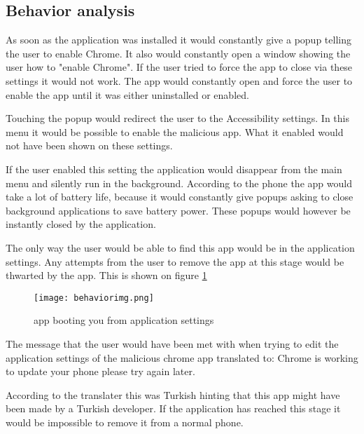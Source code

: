 \subsection{Behavior analysis}

As soon as the application was installed it would constantly give a popup telling the user to enable Chrome. 
It also would constantly open a window showing the user how to "enable Chrome". 
If the user tried to force the app to close via these settings it would not work. 
The app would constantly open and force the user to enable the app until it was either uninstalled or enabled.
 
Touching the popup would redirect the user to the Accessibility settings. 
In this menu it would be possible to enable the malicious app. 
What it enabled would not have been shown on these settings.

If the user enabled this setting the application would disappear from the main menu and silently run in the background. 
According to the phone the app would take a lot of battery life, because it would constantly give popups asking to close background applications to save battery power. 
These popups would however be instantly closed by the application.

The only way the user would be able to find this app would be in the application settings. 
Any attempts from the user to remove the app at this stage would be thwarted by the app.
This is shown on figure \ref{tim-appbehavior}

\begin{figure}[H]
    \centering
    \texttt{[image: behaviorimg.png]}
    \caption{app booting you from application settings}
    \label{tim-appbehavior}
\end{figure}

The message that the user would have been met with when trying to edit the application settings of the malicious chrome app translated to: 
Chrome is working to update your phone please try again later.

According to the translater this was Turkish hinting that this app might have been made by a Turkish developer.
If the application has reached this stage it would be impossible to remove it from a normal phone.
